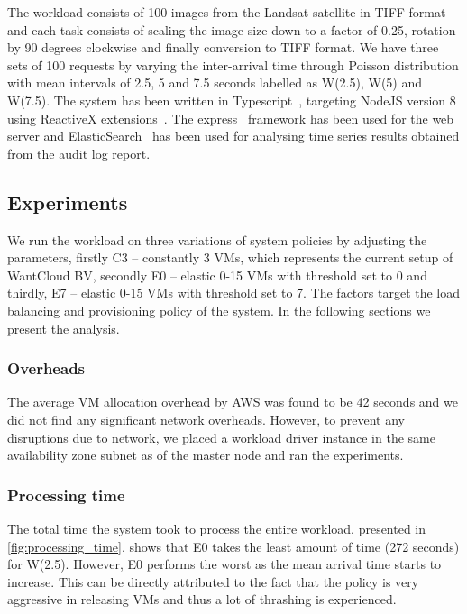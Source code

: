 \documentclass[a4paper]{IEEEtran}
\begin{document}
 The workload consists of 100 images from the Landsat satellite in TIFF format and each task consists of
 scaling the image size down to a factor of 0.25, rotation by 90 degrees clockwise and finally conversion to 
 TIFF format. We have three sets of 100 requests by varying the inter-arrival time through Poisson distribution
 with mean intervals of 2.5, 5 and 7.5 seconds labelled as \textsc{W(2.5)}, \textsc{W(5)} and \textsc{W(7.5)}. The
 system has been written in Typescript~\cite{typescript}, targeting NodeJS version 8 using ReactiveX extensions~\cite{reactivex}. The express~\cite{express} framework has
 been used for the web server and ElasticSearch~\cite{elasticsearch} has been used for analysing time series results obtained from the audit log report. 

\subsection{Experiments}

We run the workload on three variations of system policies by adjusting the parameters,
 firstly \textsc{C3} -- constantly 3 VMs, which represents the current setup of WantCloud BV, secondly \textsc{E0} -- elastic 0-15 VMs with threshold set to 0 and thirdly, \textsc{E7} -- elastic 0-15 VMs with threshold set to 7. The factors target the load balancing and provisioning policy of the system. In the following sections we present the analysis.

\subsubsection{Overheads}

The average VM allocation overhead by AWS was found to be 42 seconds and we did not find any significant network overheads. However, to prevent any disruptions due to network, we placed a workload driver instance in the same availability zone subnet as of the master node and ran the experiments.

\subsubsection{Processing time}

The total time the system took to process the entire workload, presented
in \autoref{fig:processing_time}, shows that E0 takes the least amount of time (272 seconds) for W(2.5). However, E0 performs the worst as the mean arrival time starts to increase. This can be directly attributed to the fact that the policy is very aggressive in releasing VMs and thus a lot of thrashing is experienced.
\end{document}
